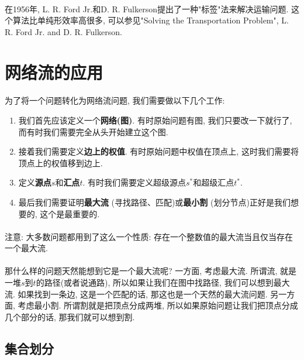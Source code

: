 \paragraph{}在1956年, L. R. Ford Jr.和D. R. Fulkerson提出了一种"标签"法来解决运输问题. 这个算法比单纯形效率高很多, 可以参见"Solving the Transportation Problem", L. R. Ford Jr. and D. R. Fulkerson.



\section{网络流的应用}
        \paragraph{} 为了将一个问题转化为网络流问题, 我们需要做以下几个工作:
        \begin{enumerate}
         \item 我们首先应该定义一个{\bf 网络(图)}. 有时原始问题有图, 我们只要改一下就行了, 而有时我们需要完全从头开始建立这个图.
         \item 接着我们需要定义{\bf 边上的权值}. 有时原始问题中权值在顶点上, 这时我们需要将顶点上的权值移到边上.
         \item 定义{\bf 源点$s$}和{\bf 汇点$t$}. 有时我们需要定义超级源点$s^*$和超级汇点$t^*$.
         \item 最后我们需要证明{\bf 最大流} (寻找路径、匹配)或{\bf 最小割} (划分节点)正好是我们想要的, 这个是最重要的.
        \end{enumerate}
        \paragraph{}注意: 大多数问题都用到了这么一个性质: 存在一个整数值的最大流当且仅当存在一个最大流.
        \paragraph{}那什么样的问题天然能想到它是一个最大流呢? 一方面, 考虑最大流. 所谓流, 就是一堆$s$到$t$的路径(或者说通路), 所以如果让我们在图中找路径, 我们可以想到最大流. 如果找到一条边, 这是一个匹配的话, 那这也是一个天然的最大流问题. 另一方面, 考虑最小割. 所谓割就是把顶点分成两堆, 所以如果原始问题让我们把顶点分成几个部分的话, 那我们就可以想到割.
        
    \subsection{集合划分}
